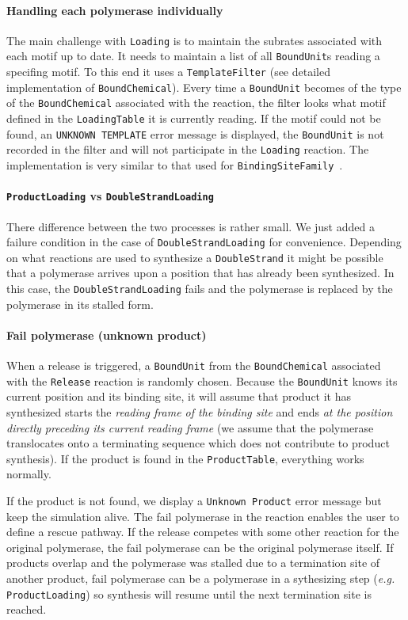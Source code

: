\paragraph{Handling each polymerase individually} The main challenge with \texttt{Loading} is to maintain the subrates associated with each motif up to date. It needs to maintain a list of all \texttt{BoundUnit}s reading a specifing motif. To this end it uses a \texttt{TemplateFilter} (see detailed implementation of \texttt{BoundChemical}). Every time a \texttt{BoundUnit} becomes of the type of the \texttt{BoundChemical} associated with the reaction, the filter looks what motif defined in the \texttt{LoadingTable} it is currently reading. If the motif could not be found, an \texttt{UNKNOWN TEMPLATE} error message is displayed, the \texttt{BoundUnit} is not recorded in the filter and will not participate in the \texttt{Loading} reaction. The implementation is very similar to that used for \texttt{BindingSiteFamily}~.

\paragraph{\texttt{ProductLoading} vs \texttt{DoubleStrandLoading}} There difference between the two processes is rather small. We just added a failure condition in the case of \texttt{DoubleStrandLoading} for convenience. Depending on what reactions are used to synthesize a \texttt{DoubleStrand} it might be possible that a polymerase arrives upon a position that has already been synthesized. In this case, the \texttt{DoubleStrandLoading} fails and the polymerase is replaced by the polymerase in its stalled form.


\paragraph{Fail polymerase (unknown product)} When a release is triggered, a \texttt{BoundUnit} from the \texttt{BoundChemical} associated with the \texttt{Release} reaction is randomly chosen. Because the \texttt{BoundUnit} knows its current position and its binding site, it will assume that product it has synthesized starts the \emph{reading frame of the binding site} and ends \emph{at the position directly preceding its current reading frame} (we assume that the polymerase translocates onto a terminating sequence which does not contribute to product synthesis). If the product is found in the \texttt{ProductTable}, everything works normally. 

If the product is not found, we display a \texttt{Unknown Product} error message but keep the simulation alive. The fail polymerase in the reaction enables the user to define a rescue pathway. If the release competes with some other reaction for the original polymerase, the fail polymerase can be the original polymerase itself. If products overlap and the polymerase was stalled due to a termination site of another product, fail polymerase can be a polymerase in a sythesizing step (\textit{e.g.} \texttt{ProductLoading}) so synthesis will resume until the next termination site is reached.
